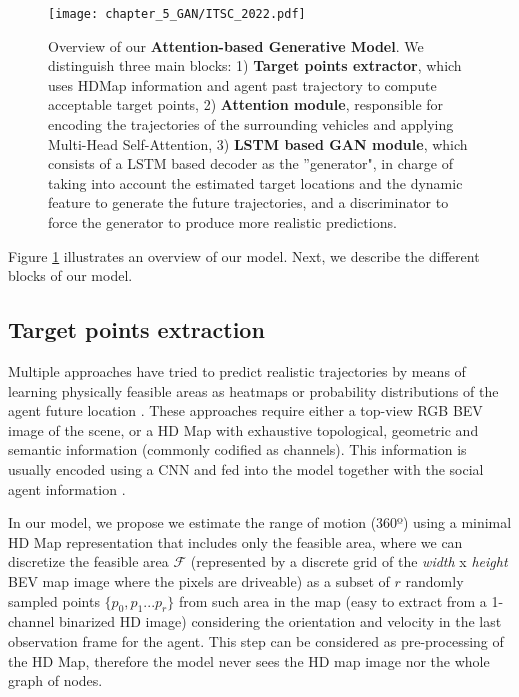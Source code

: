 \begin{figure}[h] 
	\centering
	\texttt{[image: chapter\_5\_GAN/ITSC\_2022.pdf]}
	\caption[Overview of our Attention-based Generative Model]{Overview of our \textbf{Attention-based Generative Model}. We distinguish three main blocks: 1) \textbf{Target points extractor}, which uses HDMap information and agent past trajectory to compute acceptable target points, 2) \textbf{Attention module}, responsible for encoding the trajectories of the surrounding vehicles and applying Multi-Head Self-Attention, 3) \textbf{LSTM based GAN module}, which consists of a LSTM based decoder as the ''generator", in charge of taking into account the estimated target locations and the dynamic feature to generate the future trajectories, and a discriminator to force the generator to produce more realistic predictions.}
	\label{fig:chapter_5_GAN/ITSC_2022}
\end{figure}

Figure \ref{fig:chapter_5_GAN/ITSC_2022} illustrates an overview of our model. Next, we describe the different blocks of our model.

\subsection{Target points extraction}
\label{subsec:5_target_points_extraction}

Multiple approaches have tried to predict realistic trajectories by means of learning physically feasible areas as heatmaps or probability distributions of the agent future location \cite{dendorfer2020goal, sadeghian2019sophie, gilles2021home}. These approaches require either a top-view RGB BEV image of the scene, or a HD Map with exhaustive topological, geometric and semantic information (commonly codified as channels). This information is usually encoded using a CNN and fed into the model together with the social agent information \cite{dendorfer2020goal, sadeghian2019sophie, gao2020vectornet}.

In our model, we propose we estimate the range of motion (360º) using a minimal HD Map representation that includes only the feasible area, where we can discretize the feasible area $\mathcal{F}$ (represented by a discrete grid of the \textit{width} x \textit{height} BEV map image where the pixels are driveable) as a subset of $r$ randomly sampled points $\{p_0 , p_1 ... p_r\}$ from such area in the map (easy to extract from a 1-channel binarized HD image) considering the orientation and velocity in the last observation frame for the agent. This step can be considered as pre-processing of the HD Map, therefore the model never sees the HD map image nor the whole graph of nodes. 

